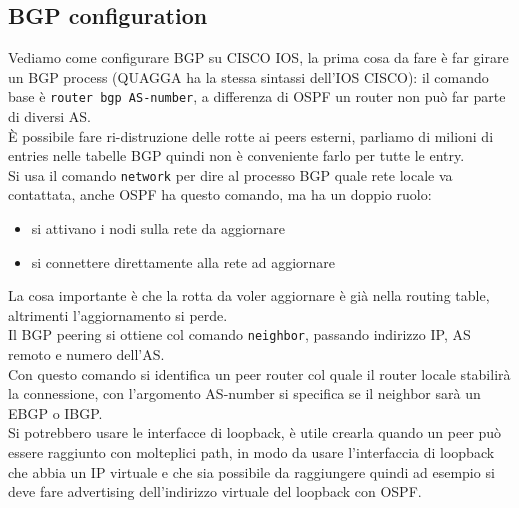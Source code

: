 \documentclass[12pt, oneside]{extbook} %
\begin{document}
\subsection{BGP configuration} 
Vediamo come configurare BGP su CISCO IOS, la prima cosa da fare è far girare un BGP process (QUAGGA ha la stessa sintassi dell'IOS CISCO): il comando base è \texttt{router bgp AS-number}, a differenza di OSPF un router non può far parte di diversi AS.
\\È possibile fare ri-distruzione delle rotte ai peers esterni, parliamo di milioni di entries nelle tabelle BGP quindi non è conveniente farlo per tutte le entry.
\\Si usa il comando \texttt{network} per dire al processo BGP quale rete locale va contattata, anche OSPF ha questo comando, ma ha un doppio ruolo:
\begin{itemize}
    \item si attivano i nodi sulla rete da aggiornare
    \item si connettere direttamente alla rete ad aggiornare
\end{itemize}
La cosa importante è che la rotta da voler aggiornare è già nella routing table, altrimenti l'aggiornamento si perde.
\\Il BGP peering si ottiene col comando \texttt{neighbor}, passando indirizzo IP, AS remoto e numero dell'AS.
\\Con questo comando si identifica un peer router col quale il router locale stabilirà la connessione, con l'argomento AS-number si specifica se il neighbor sarà un EBGP o IBGP.
\\Si potrebbero usare le interfacce di loopback, è utile crearla quando un peer può essere raggiunto con molteplici path, in modo da usare l'interfaccia di loopback che abbia un IP virtuale e che sia possibile da raggiungere quindi ad esempio si deve fare advertising dell'indirizzo virtuale del loopback con OSPF.
\end{document}

